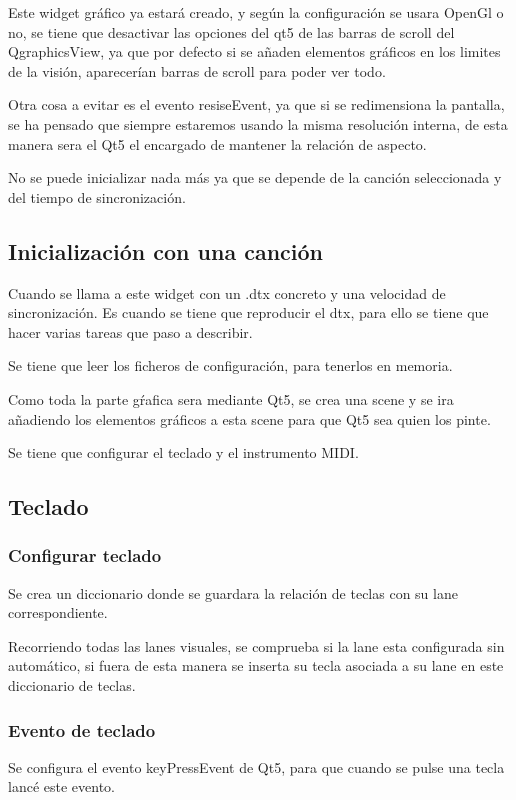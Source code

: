 \documentclass[a4paper,11pt,oneside]{book}
\begin{document}
Este widget gráfico ya estará creado, y según la configuración se usara OpenGl o no, se tiene que desactivar las opciones del qt5 de las barras de scroll del QgraphicsView, ya que por defecto si se añaden elementos gráficos en los limites de la visión, aparecerían barras de scroll para poder ver todo.

Otra cosa a evitar es el evento resiseEvent, ya que si se redimensiona la pantalla, se ha pensado que siempre estaremos usando la misma resolución interna, de esta manera sera el Qt5 el encargado de mantener la relación de aspecto.

No se puede inicializar nada más ya que se depende de la canción seleccionada y del tiempo de sincronización.

\subsection{Inicialización con una canción}
Cuando se llama a este widget con un .dtx concreto y una velocidad de sincronización. Es cuando se tiene que reproducir el dtx, para ello se tiene que hacer varias tareas que paso a describir.

Se tiene que leer los ficheros de configuración, para tenerlos en memoria.

Como toda la parte gŕafica sera mediante Qt5, se crea una scene y se ira añadiendo los elementos gráficos a esta scene para que Qt5 sea quien los pinte.

Se tiene que configurar el teclado y el instrumento MIDI.

\subsection{Teclado}
\subsubsection{Configurar teclado}
Se crea un diccionario donde se guardara la relación de teclas con su lane correspondiente.

Recorriendo todas las lanes visuales, se comprueba si la lane esta configurada sin automático, si fuera de esta manera se inserta su tecla asociada a su lane en este diccionario de teclas. 

\subsubsection{Evento de teclado}
Se configura el evento keyPressEvent de Qt5, para que cuando se pulse una tecla lancé este evento.
\end{document}
